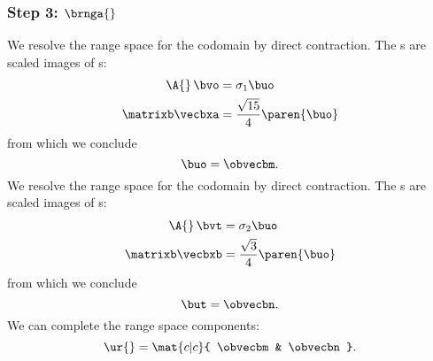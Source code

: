 \subsubsection{Step 3: $\brnga{}$}
We resolve the range space for the codomain by direct contraction. The \mv s are scaled images of \nv s:
\begin{equation}
  \begin{split}
    \A{}\,\bvo       &= \sigma_{1} \buo \\
    \matrixb \vecbxa &= \frac{\sqrt{15}}{4} \paren{\buo}  
  \end{split}
\end{equation}
from which we conclude
\begin{equation}
  \buo = \obvecbm.
\end{equation}
%
We resolve the range space for the codomain by direct contraction. The \mv s are scaled images of \nv s:
\begin{equation}
  \begin{split}
    \A{}\,\bvt       &= \sigma_{2} \buo \\
    \matrixb \vecbxb &= \frac{\sqrt{3}}{4} \paren{\buo}  
  \end{split}
\end{equation}
from which we conclude
\begin{equation}
  \but = \obvecbn.
\end{equation}
We can complete the range space components:
\begin{equation}
  \ur{} = \mat{c|c}{ \obvecbm & \obvecbn }.
\end{equation}


